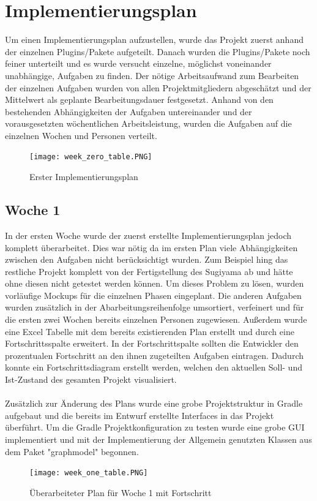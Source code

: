\chapter{Implementierungsplan}
\label{ch:implplan}
Um einen Implementierungsplan aufzustellen, wurde das Projekt zuerst anhand der einzelnen Plugins/Pakete aufgeteilt. Danach wurden die Plugins/Pakete noch feiner unterteilt und es wurde versucht einzelne, möglichst voneinander unabhängige, Aufgaben zu finden. Der nötige Arbeitsaufwand zum Bearbeiten der einzelnen Aufgaben wurden von allen Projektmitgliedern abgeschätzt und der Mittelwert als geplante Bearbeitungsdauer festgesetzt. Anhand von den bestehenden Abhängigkeiten der Aufgaben untereinander und der vorausgesetzten wöchentlichen Arbeitsleistung, wurden die Aufgaben auf die einzelnen Wochen und Personen verteilt. \\
\begin{figure}[!htbp]
	\centering
	\texttt{[image: week\_zero\_table.PNG]}
	\caption{Erster Implementierungsplan}
	\label{fig:week_zero_table}
\end{figure}

\newpage

\section{Woche 1}
In der ersten Woche wurde der zuerst erstellte Implementierungsplan jedoch komplett überarbeitet. Dies war nötig da im ersten Plan viele Abhängigkeiten zwischen den Aufgaben nicht berücksichtigt wurden. Zum Beispiel hing das restliche Projekt komplett von der Fertigstellung des Sugiyama ab und hätte ohne diesen nicht getestet werden können. Um dieses Problem zu lösen, wurden vorläufige Mockups für die einzelnen Phasen eingeplant. Die anderen Aufgaben wurden zusätzlich in der Abarbeitungsreihenfolge umsortiert, verfeinert und für die ersten zwei Wochen bereits einzelnen Personen zugewiesen. Außerdem wurde eine Excel Tabelle mit dem bereits existierenden Plan erstellt und durch eine Fortschrittsspalte erweitert. In der Fortschrittspalte sollten die Entwickler den prozentualen Fortschritt an den ihnen zugeteilten Aufgaben eintragen. Dadurch konnte ein Fortschrittsdiagram erstellt werden, welchen den aktuellen Soll- und Ist-Zustand des gesamten Projekt visualisiert.\\
\\
Zusätzlich zur Änderung des Plans wurde eine grobe Projektstruktur in Gradle aufgebaut und die bereits im Entwurf erstellte Interfaces in das Projekt überführt. Um die Gradle Projektkonfiguration zu testen wurde eine grobe GUI implementiert und mit der Implementierung der Allgemein genutzten Klassen aus dem Paket "graphmodel"  begonnen.
\begin{figure}[!htbp]
	\centering
	\texttt{[image: week\_one\_table.PNG]}
	\caption{Überarbeiteter Plan für Woche 1 mit Fortschritt}
	\label{fig:week_one_table}
\end{figure}
